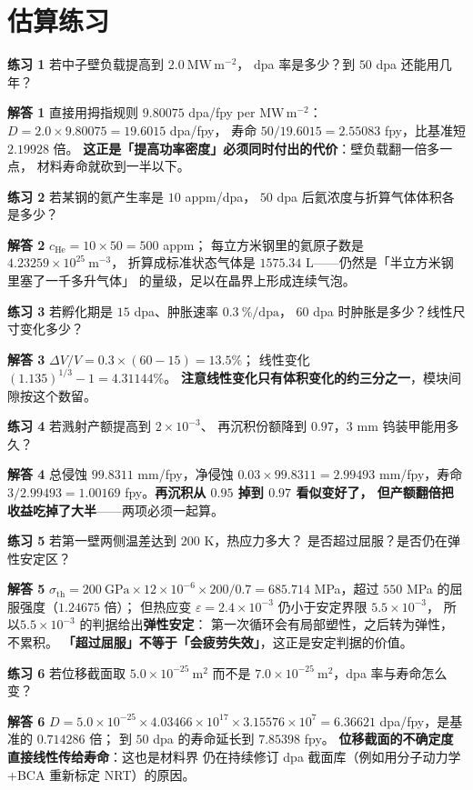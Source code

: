 \section{估算练习}
\label{sec:app-ay-problems}

\textbf{练习 1} 若中子壁负载提高到 $2.0\ \mathrm{MW\,m^{-2}}$，
dpa 率是多少？到 $50$ dpa 还能用几年？

\textbf{解答 1} 直接用拇指规则 $9.80075$ dpa/fpy per $\mathrm{MW\,m^{-2}}$：
$D=2.0\times9.80075=19.6015$ dpa/fpy，
寿命 $50/19.6015=2.55083$ fpy，比基准短 $2.19928$ 倍。
\textbf{这正是「提高功率密度」必须同时付出的代价}：壁负载翻一倍多一点，
材料寿命就砍到一半以下。

\textbf{练习 2} 若某钢的氦产生率是 $10$ appm/dpa，
$50$ dpa 后氦浓度与折算气体体积各是多少？

\textbf{解答 2} $c_\mathrm{He}=10\times50=500$ appm；
每立方米钢里的氦原子数是 $4.23259\times10^{25}\ \mathrm{m^{-3}}$，
折算成标准状态气体是 $1575.34$ L——仍然是「半立方米钢里塞了一千多升气体」
的量级，足以在晶界上形成连续气泡。

\textbf{练习 3} 若孵化期是 $15$ dpa、肿胀速率 $0.3\ \%/\mathrm{dpa}$，
$60$ dpa 时肿胀是多少？线性尺寸变化多少？

\textbf{解答 3} $\Delta V/V=0.3\times(60-15)=13.5\%$；
线性变化 $(1.135)^{1/3}-1=4.31144\%$。
\textbf{注意线性变化只有体积变化的约三分之一}，模块间隙按这个数留。

\textbf{练习 4} 若溅射产额提高到 $2\times10^{-3}$、
再沉积份额降到 $0.97$，$3$ mm 钨装甲能用多久？

\textbf{解答 4} 总侵蚀 $99.8311$ mm/fpy，净侵蚀
$0.03\times99.8311=2.99493$ mm/fpy，寿命
$3/2.99493=1.00169$ fpy。\textbf{再沉积从 $0.95$ 掉到 $0.97$ 看似变好了，
但产额翻倍把收益吃掉了大半}——两项必须一起算。

\textbf{练习 5} 若第一壁两侧温差达到 $200$ K，热应力多大？
是否超过屈服？是否仍在弹性安定区？

\textbf{解答 5} $\sigma_\mathrm{th}=200\ \mathrm{GPa}\times12\times10^{-6}
\times200/0.7=685.714$ MPa，超过 $550$ MPa 的屈服强度（$1.24675$ 倍）；
但热应变 $\varepsilon=2.4\times10^{-3}$ 仍小于安定界限 $5.5\times10^{-3}$，
所以$5.5\times10^{-3}$ 的判据给出\textbf{弹性安定}：
第一次循环会有局部塑性，之后转为弹性，不累积。
\textbf{「超过屈服」不等于「会疲劳失效」}，这正是安定判据的价值。

\textbf{练习 6} 若位移截面取 $5.0\times10^{-25}\ \mathrm{m^2}$
而不是 $7.0\times10^{-25}\ \mathrm{m^2}$，dpa 率与寿命怎么变？

\textbf{解答 6} $D=5.0\times10^{-25}\times4.03466\times10^{17}
\times3.15576\times10^{7}=6.36621$ dpa/fpy，是基准的 $0.714286$ 倍；
到 $50$ dpa 的寿命延长到 $7.85398$ fpy。
\textbf{位移截面的不确定度直接线性传给寿命}：这也是材料界
仍在持续修订 dpa 截面库（例如用分子动力学+BCA 重新标定 NRT）的原因。

